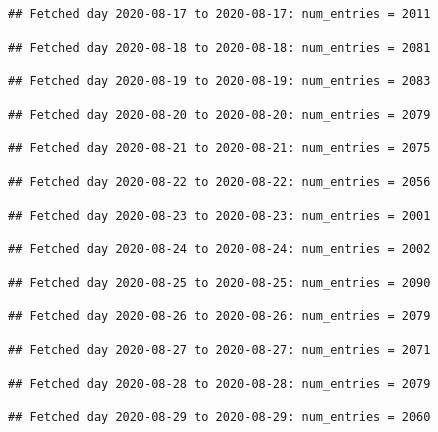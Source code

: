 \documentclass[]{article}
\begin{document}
\begin{verbatim}
## Fetched day 2020-08-17 to 2020-08-17: num_entries = 2011
\end{verbatim}

\begin{verbatim}
## Fetched day 2020-08-18 to 2020-08-18: num_entries = 2081
\end{verbatim}

\begin{verbatim}
## Fetched day 2020-08-19 to 2020-08-19: num_entries = 2083
\end{verbatim}

\begin{verbatim}
## Fetched day 2020-08-20 to 2020-08-20: num_entries = 2079
\end{verbatim}

\begin{verbatim}
## Fetched day 2020-08-21 to 2020-08-21: num_entries = 2075
\end{verbatim}

\begin{verbatim}
## Fetched day 2020-08-22 to 2020-08-22: num_entries = 2056
\end{verbatim}

\begin{verbatim}
## Fetched day 2020-08-23 to 2020-08-23: num_entries = 2001
\end{verbatim}

\begin{verbatim}
## Fetched day 2020-08-24 to 2020-08-24: num_entries = 2002
\end{verbatim}

\begin{verbatim}
## Fetched day 2020-08-25 to 2020-08-25: num_entries = 2090
\end{verbatim}

\begin{verbatim}
## Fetched day 2020-08-26 to 2020-08-26: num_entries = 2079
\end{verbatim}

\begin{verbatim}
## Fetched day 2020-08-27 to 2020-08-27: num_entries = 2071
\end{verbatim}

\begin{verbatim}
## Fetched day 2020-08-28 to 2020-08-28: num_entries = 2079
\end{verbatim}

\begin{verbatim}
## Fetched day 2020-08-29 to 2020-08-29: num_entries = 2060
\end{verbatim}
\end{document}
